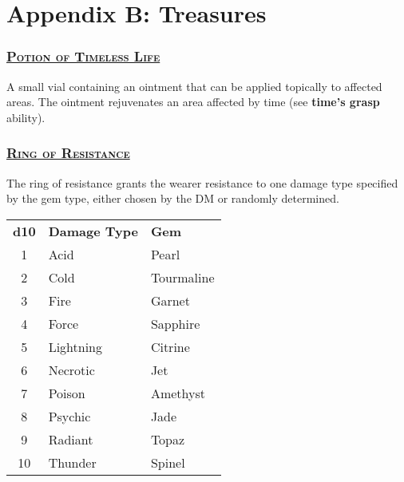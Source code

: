 \section{Appendix B: Treasures}

\subsubsection*{\underline{\textsc{\Large Potion of Timeless Life}}}
A small vial containing an ointment that can be applied topically to affected areas. The ointment rejuvenates an area affected by time (see \textbf{time's grasp} ability).
	
\subsubsection*{\underline{\textsc{\Large Ring of Resistance}}}
The ring of resistance grants the wearer resistance to one damage type specified by the gem type, either chosen by the DM or randomly determined.

\begin{table}[H]
	\begin{tabular}{cll}
		\textbf{d10} & \textbf{Damage Type} & \textbf{Gem} \\
		1 & Acid & Pearl \\
		2 & Cold & Tourmaline \\
		3 & Fire & Garnet \\
		4 & Force & Sapphire \\
		5 & Lightning & Citrine \\
		6 & Necrotic & Jet \\
		7 & Poison & Amethyst \\
		8 & Psychic & Jade \\
		9 & Radiant & Topaz \\
		10 & Thunder & Spinel \\
	\end{tabular}
\end{table}